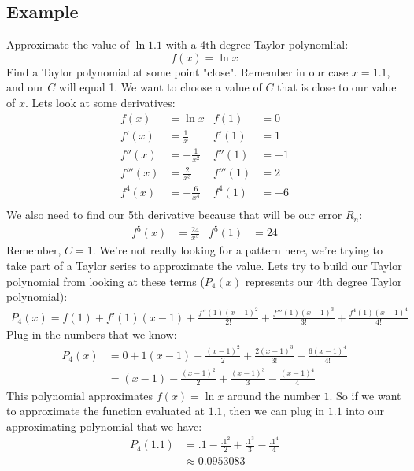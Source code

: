 \documentclass{report}
\begin{document}
    \subsection{Example}
        Approximate the value of \(\ln 1.1\) with a 4th degree Taylor polynomlial:
        \[f(x) = \ln x\]
        Find a Taylor polynomial at some point "close".
        Remember in our case \(x = 1.1\), and our \(C\) will equal 1.
        We want to choose a value of \(C\) that is close to our value of \(x\).
        Lets look at some derivatives:
        \begin{align*}
            f(x) &= \ln x 
            &f(1) &= 0 \\
            f'(x) &= \frac{1}{x}
            &f'(1) &= 1 \\
            f''(x) &= - \frac{1}{x^2}
            &f''(1) &= -1 \\
            f'''(x) &= \frac{2}{x^3}
            &f'''(1) &= 2 \\
            f^4(x) &= - \frac{6}{x^4}
            &f^4(1) &= -6 \\
        \end{align*}
        We also need to find our 5th derivative because that will be our error \(R_n\):
        \begin{align*}
            f^5(x) &= \frac{24}{x^5}
            &f^5(1) &= 24
        \end{align*}
        Remember, \(C = 1\).
        We're not really looking for a pattern here, we're trying to take part of a Taylor series to approximate the value.
        Lets try to build our Taylor polynomial from looking at these terms (\(P_4(x)\) represents our 4th degree Taylor polynomial):
        \begin{align*}
            P_4(x) = f(1) + f'(1)(x-1) + \frac{f''(1)(x-1)^2}{2!} + \frac{f'''(1)(x-1)^3}{3!} + \frac{f^4(1)(x-1)^4}{4!}
        \end{align*}
        Plug in the numbers that we know:
        \begin{align*}
            P_4(x) &= 0 + 1(x-1) - \frac{(x-1)^2}{2} + \frac{2(x-1)^3}{3!} - \frac{6(x-1)^4}{4!} \\
            &= (x-1) - \frac{(x-1)^2}{2} + \frac{(x-1)^3}{3} -\frac{(x-1)^4}{4}
        \end{align*}
        This polynomial approximates \(f(x) = \ln x\) around the number \(1\).
        So if we want to approximate the function evaluated at \(1.1\), then we can plug in \(1.1\) into our approximating polynomial that we have:
        \begin{align*}
            P_4(1.1) &= .1 - \frac{.1^2}{2} + \frac{.1^3}{3} - \frac{.1^4}{4} \\
            &\approx 0.0953083
        \end{align*}
\end{document}
